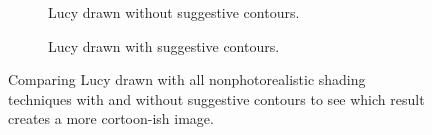 \documentclass[10pt,twocolumn,letterpaper]{article}
\begin{document}
\begin{figure}
    \centering
    \begin{subfigure}{.48\linewidth}
        \caption{Lucy drawn without suggestive contours.}
        \label{fig:lucy-base}
    \end{subfigure}
    \hfill
    \begin{subfigure}{.48\linewidth}
        \caption{Lucy drawn with suggestive contours.}
        \label{fig:lucy-final}
    \end{subfigure}
    \caption{Comparing Lucy drawn with all nonphotorealistic shading techniques with and without suggestive contours to see which result creates a more cortoon-ish image.}
    \label{fig:lucy-compare}
\end{figure}
\end{document}
